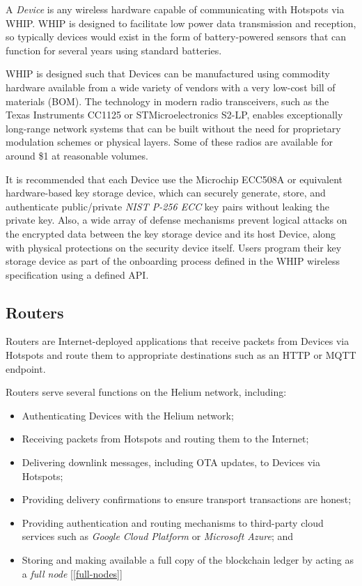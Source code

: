 \documentclass[10pt, nonatbib, nocopyrightspace, reprint]{sigplanconf}
\newcommand{\secref}[1]{[\autoref{#1}]}
\begin{document}
A \emph{Device} is any wireless hardware capable of communicating with Hotspots via WHIP. WHIP is designed to facilitate low power data transmission and reception, so typically devices would exist in the form of battery-powered sensors that can function for several years using standard batteries.

WHIP is designed such that Devices can be manufactured using commodity hardware available from a wide variety of vendors with a very low-cost bill of materials (BOM). The technology in modern radio transceivers, such as the Texas Instruments CC1125 or STMicroelectronics S2-LP, enables exceptionally long-range network systems that can be built without the need for proprietary modulation schemes or physical layers. Some of these radios are available for around \$1 at reasonable volumes.

It is recommended that each Device use the Microchip ECC508A or equivalent hardware-based key storage device, which can securely generate, store, and authenticate public/private \emph{NIST P-256 ECC} \cite{nist} key pairs without leaking the private key. Also, a wide array of defense mechanisms prevent logical attacks on the encrypted data between the key storage device and its host Device, along with physical protections on the security device itself. Users program their key storage device as part of the onboarding process defined in the WHIP wireless specification using a defined API\@.

\subsection{Routers}

Routers are Internet-deployed applications that receive packets from Devices via Hotspots and route them to appropriate destinations such as an HTTP or MQTT endpoint.

Routers serve several functions on the Helium network, including:

\begin{itemize}
    \item Authenticating Devices with the Helium network;
    \item Receiving packets from Hotspots and routing them to the Internet;
    \item Delivering downlink messages, including OTA updates, to Devices via Hotspots;
    \item Providing delivery confirmations to ensure transport transactions are honest;
    \item Providing authentication and routing mechanisms to third-party cloud services such as \emph{Google Cloud Platform} or \emph{Microsoft Azure}; and
    \item Storing and making available a full copy of the blockchain ledger by acting as a \emph{full node} \secref{full-nodes}
\end{itemize}
\end{document}
